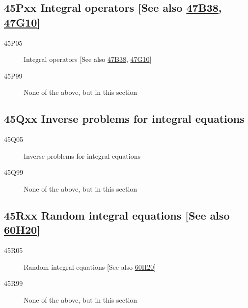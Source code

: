 \subsection*{45Pxx  Integral operators [See also \hyperref[47B38]{47B38}, \hyperref[47G10]{47G10}] }\label{45Pxx}
\begin{description}  
\item [45P05]\label{45P05} Integral operators [See also \hyperref[47B38]{47B38}, \hyperref[47G10]{47G10}]
\item [45P99]\label{45P99} None of the above, but in this section
\end{description}
\subsection*{45Qxx  Inverse problems for integral equations }\label{45Qxx}
\begin{description}  
\item [45Q05]\label{45Q05} Inverse problems for integral equations
\item [45Q99]\label{45Q99} None of the above, but in this section
\end{description}
\subsection*{45Rxx  Random integral equations [See also \hyperref[60H20]{60H20}] }\label{45Rxx}
\begin{description}  
\item [45R05]\label{45R05} Random integral equations [See also \hyperref[60H20]{60H20}]
\item [45R99]\label{45R99} None of the above, but in this section
\end{description}
